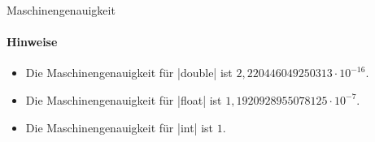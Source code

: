 \begin{exercise}{Maschinengenauigkeit}
\begin{solution}
\begin{small}
\end{small}

\bigskip
\noindent
\paragraph{Hinweise}
\begin{itemize}
\item
Die Maschinengenauigkeit für \code|double| ist $2{,}220446049250313\cdot 10^{-16}$.

\item
Die Maschinengenauigkeit für \code|float| ist $1{,}1920928955078125\cdot 10^{-7}$.

\item
Die Maschinengenauigkeit für \code|int| ist $1$. 
\end{itemize}
\end{solution}
\end{exercise}

